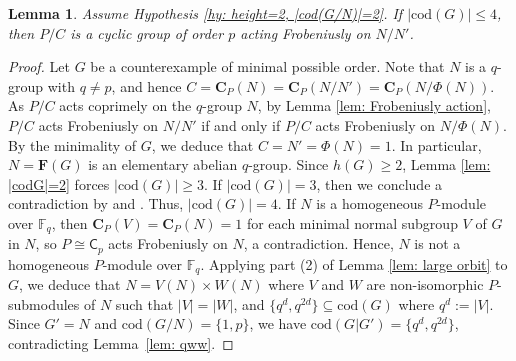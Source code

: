 \documentclass[9pt]{article}
\newtheorem{lem}{\bf Lemma}[section]
\begin{document}
\begin{lem}\label{lem: P/C acts fpf on N/N'}
	Assume Hypothesis \ref{hy: height=2, |cod(G/N)|=2}.
	If $|\mathrm{cod}(G)|\leq 4$,
	then $P/C$ is a cyclic group of order $p$ acting Frobeniusly on $N/N'$.
\end{lem}
\begin{proof}
	Let $G$ be a counterexample of minimal possible order.
	Note that $N$ is a $q$-group with $q\neq p$,
	and hence
	$C=\mathbf{C}_{P}(N)=\mathbf{C}_{P}(N/N')=\mathbf{C}_{P}(N/\Phi(N))$.
	As $P/C$ acts coprimely on the $q$-group $N$, by Lemma \ref{lem: Frobeniusly action},  
    $P/C$ acts Frobeniusly on $N/N'$ if and only if $P/C$ acts Frobeniusly on $N/\Phi(N)$.
	By the minimality of $G$, we deduce that $C=N'=\Phi(N)=1$.
	In particular, $N=\mathbf{F}(G)$ is an elementary abelian $q$-group.
	Since $h(G)\geq 2$, Lemma \ref{lem: |codG|=2} forces $|\mathrm{cod}(G)|\geq 3$.
	If $|\mathrm{cod}(G)|= 3$, then we conclude a contradiction by \cite[Theorem 3.4]{alizadeh2019}
	and \cite[Theorem 0.1]{alizadeh2022}.
	Thus, $|\mathrm{cod}(G)|=4$.
    If $N$ is a homogeneous $P$-module over $\mathbb{F}_q$,
	then $\mathbf{C}_{P}(V)=\mathbf{C}_{P}(N)=1$ for each minimal normal subgroup $V$ of $G$ in $N$,
	so $P\cong \mathsf{C}_{p}$ acts Frobeniusly on $N$, a contradiction. 
    Hence, $N$ is not a homogeneous $P$-module over $\mathbb{F}_q$.
	Applying part (2) of Lemma \ref{lem: large orbit} to $G$, we deduce that 
    $N=V(N)\times W(N)$ where $V$ and $W$ are non-isomorphic $P$-submodules of $N$
	such that $|V|=|W|$, and $\{ q^{d},q^{2d}\}\subseteq \mathrm{cod}(G)$ where $q^{d}:=|V|$.
	Since $G'=N$ and $\mathrm{cod}(G/N)=\{1,p\}$, we have $\mathrm{cod}(G|G')=\{q^{d},q^{2d}\}$, contradicting Lemma~\ref{lem: qww}.
\end{proof}
\end{document}
